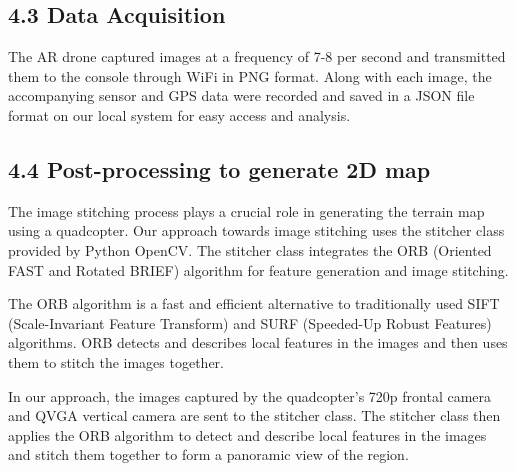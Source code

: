 \documentclass[
  journal=largetwo,
  manuscript=article-type,
  year=2023,
  volume=1,
]{iitp-journal}
\begin{document}
\subsection{4.3 Data Acquisition}
The AR drone captured images at a frequency of 7-8 per second and transmitted them to the console through WiFi in PNG format. Along with each image, the accompanying sensor and GPS data were recorded and saved in a JSON file format on our local system for easy access and analysis.

\subsection{4.4 Post-processing to generate 2D map}
The image stitching process plays a crucial role in generating the terrain map using a quadcopter. Our approach towards image stitching uses the stitcher class provided by Python OpenCV. The stitcher class integrates the ORB (Oriented FAST and Rotated BRIEF) algorithm for feature generation and image stitching.

The ORB algorithm is a fast and efficient alternative to traditionally used SIFT (Scale-Invariant Feature Transform) and SURF (Speeded-Up Robust Features) algorithms. ORB detects and describes local features in the images and then uses them to stitch the images together.

In our approach, the images captured by the quadcopter's 720p frontal camera and QVGA vertical camera are sent to the stitcher class. The stitcher class then applies the ORB algorithm to detect and describe local features in the images and stitch them together to form a panoramic view of the region.
\end{document}
